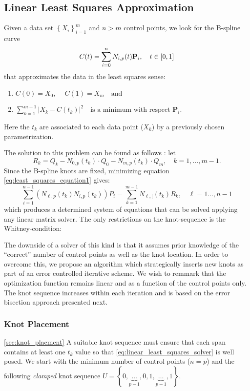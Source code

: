 \subsection{Linear Least Squares Approximation}
Given a data set $\left\{X_i\right\}_{i=1}^m$ and $n>m$ control points, 
we look for the B-spline curve 
\begin{equation}\label{eq:least_squares_equation1}
 C(t) = \sum_{i=0}^n N_{i,p}(t) \textbf P_i,\quad t\in[0,1]
\end{equation}
that approximates the data in the least squares sense:
\begin{enumerate}
 \item $ C(0)= X_0, \quad \  C(1) = X_m\quad \text{and}$
 \item $\sum _{k= 1}^{m-1}\left | X_k - C(t_k)\right|^2\quad \text{is a minimum with respect }\mathbf P_i.$
\end{enumerate}
Here the $t_k$ are associated to each data point ($X_k$) 
by a previously chosen parametrization. 

The solution to this problem can be found as follows \cite[Ch. 9.4.1]{nurbs_book}:
let 
$$
 R_k = Q_k - N_{0,p}(t_k)\cdot Q_0 - N_{m,p}(t_k)\cdot Q_m,  \quad k = 1,\ldots, m-1.
$$
Since the B-spline knots are fixed, minimizing equation \eqref{eq:least_squares_equation1} gives:
\begin{equation}\label{eq:linear_least_squares_solver}
 \sum_{i=1}^{n-1} \left(N_{\ell, p}(t_k)N_{i,p}(t_k)\right)P_i= \sum_{k=1}^{m-1}N_{\ell,[}(t_k)R_k, \quad \ell= 1\ldots, n-1
\end{equation}
 which produces a determined system of equations that can be solved applying
 any linear matrix solver. The only restrictions on the knot-sequence is the Whitney-condition:
 
The downside of a solver of this kind is that 
it assumes prior knowledge of the ``correct'' number of control points as well as the knot 
location. In order to overcome this, we propose an algorithm which strategically inserts new knots as part of an 
error controlled iterative scheme. We wish to remmark that the optimization function remains linear and as a 
function of the control points only. The knot sequence increases within each iteration 
and is based on the error bisection approach presented next. 
 
\subsubsection{Knot Placement}\ref{sec:knot_placment}
A suitable knot sequence must ensure that each span contains at least one $t_k$ value so that \eqref{eq:linear_least_squares_solver} is well posed. 
We start with the minimum number of control points ($n = p$) and the following \emph{clamped} knot sequence 
$U=\left\{0,\underbrace{\ldots}_{p-1},0,1,\underbrace{\ldots}_{p-1},1\right\}$. 

